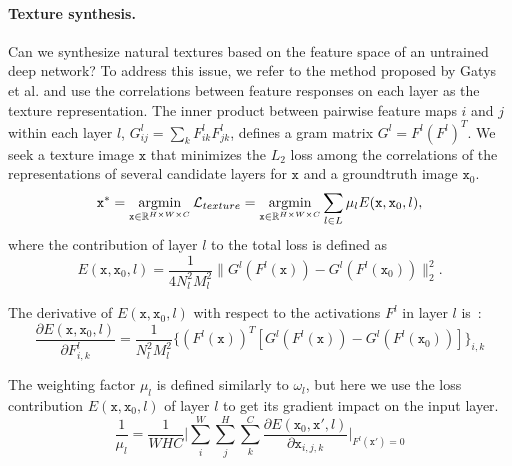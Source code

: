 \documentclass{article}
\begin{document}
\paragraph{Texture synthesis.} Can we synthesize natural textures based on the feature space of an untrained deep network?
To address this issue, we refer to the method proposed by Gatys et al.\cite{Gatys2015texture} and use the correlations between feature responses on each layer as the texture representation. %
The inner product between pairwise feature maps $i$ and $j$ within each layer $l$, $G_{ij}^l = \sum_{k} F_{ik}^lF_{jk}^l$, defines a gram matrix $G^l = F^l (F^l)^T$. %
We seek a texture image $\texttt{x}$ that minimizes the $L_2$ loss among the correlations of the representations of several candidate layers for $\texttt{x}$ and a groundtruth image $\texttt{x}_0$.
\setlength{\belowdisplayskip}{2pt}
\setlength{\abovedisplayskip}{2pt}
\begin{equation}
\texttt{x}^* = \operatornamewithlimits{argmin}_{ \texttt{x} \in \mathbb{R}^{H \times W \times C} } \mathcal{L}_{texture}  = \operatornamewithlimits{argmin}_{ \texttt{x} \in \mathbb{R}^{H \times W \times C} } \sum_{l \in L} \mu_l E(\texttt{x},\texttt{x}_0,l),
\label{eq:textureLoss}
\end{equation}
where the contribution of layer $l$ to the total loss is defined as
\setlength{\belowdisplayskip}{2pt}
\setlength{\abovedisplayskip}{2pt}
\begin{equation}
E(\texttt{x},\texttt{x}_0,l)  = \frac{1}{4N_l^2 M_l^2}  \lVert G^l(F^l(\texttt{x}))- G^l(F^l(\texttt{x}_0)) \rVert _2^2.
\label{eq:textureLoss}
\end{equation}

The derivative of $E(\texttt{x},\texttt{x}_0,l)$ with respect to the activations $F^l$ in layer $l$ is~\cite{Gatys2015texture}:
\setlength{\belowdisplayskip}{2pt}
\setlength{\abovedisplayskip}{2pt}
\begin{equation}
\frac{\partial  E(\texttt{x},\texttt{x}_0,l)}{\partial{F^l_{i,k}}} = \frac{1}{N^2_l M^2_l}\{(F^l(\texttt{x}))^T [G^l(F^l(\texttt{x}))- G^l(F^l(\texttt{x}_0))]\}_{i,k}
\label{eq:textureLoss}
\end{equation}



The weighting factor $\mu_{l}$ is defined similarly to $\omega_{l}$,
 but here we use the loss contribution $E(\texttt{x},\texttt{x}_0,l)$ of layer $l$ to get its gradient impact on the input layer.
\setlength{\belowdisplayskip}{2pt}
\setlength{\abovedisplayskip}{2pt}
\begin{equation}
\frac{1}{\mu_{l}} =\frac{1}{W H C}\bigg|  \displaystyle{ \sum_{i}^{W}} \displaystyle{ \sum_{j}^{H}} \displaystyle{\sum_{k}^{C}}\frac{\partial E(\texttt{x}_0,\texttt{x}', l)}{\partial{\texttt{x}_{i,j,k}}} \bigg|_{F^l(\texttt{x}')=0}
\label{eq:TextureW}
\end{equation}
\end{document}
